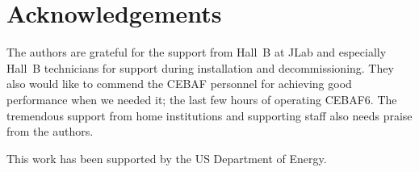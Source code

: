 \documentclass[final,3p,times,twocolumn]{elsarticle}
\begin{document}



\section{Acknowledgements}
The authors are grateful for the support from Hall~B at JLab and especially Hall~B technicians 
for support during installation and decommissioning. They also would like to commend the CEBAF 
personnel for achieving good performance when we needed it; the last few hours of operating CEBAF6. 
The tremendous support from home institutions and supporting staff also needs praise from the authors. 

This work has been supported by the US Department of Energy. 


\end{document}
